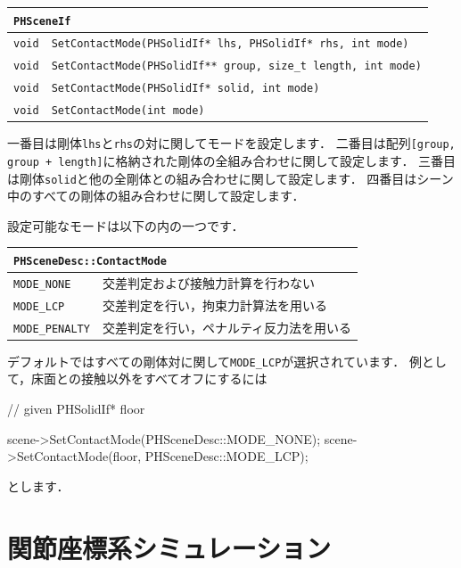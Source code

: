 \begin{center}
\begin{longtable}{p{.1\hsize}p{.9\hsize}}
\multicolumn{2}{l}{\texttt{PHSceneIf}}						\\ \midrule
\texttt{void}	& \texttt{SetContactMode(PHSolidIf* lhs, PHSolidIf* rhs, int mode)} \\
\texttt{void}   & \texttt{SetContactMode(PHSolidIf** group, size\_t length, int mode)} \\
\texttt{void}   & \texttt{SetContactMode(PHSolidIf* solid, int mode)} \\
\texttt{void}   & \texttt{SetContactMode(int mode)}
\end{longtable}
\end{center}

\KLUDGE 一番目は剛体\texttt{lhs}と\texttt{rhs}の対に関してモードを設定します．
\KLUDGE 二番目は配列\texttt{[group, group + length]}に格納された剛体の全組み合わせに関して設定します．
\KLUDGE 三番目は剛体\texttt{solid}と他の全剛体との組み合わせに関して設定します．
\KLUDGE 四番目はシーン中のすべての剛体の組み合わせに関して設定します．

\KLUDGE 設定可能なモードは以下の内の一つです．
\begin{center}
\begin{longtable}{p{.3\hsize}p{.7\hsize}}
\multicolumn{2}{l}{\texttt{PHSceneDesc::ContactMode}} \\ \midrule
\texttt{MODE\_NONE}	   & 交差判定および接触力計算を行わない \\
\texttt{MODE\_LCP}     & 交差判定を行い，拘束力計算法を用いる \\
\texttt{MODE\_PENALTY} & 交差判定を行い，ペナルティ反力法を用いる \\
\end{longtable}
\end{center}
\KLUDGE デフォルトではすべての剛体対に関して\texttt{MODE\_LCP}が選択されています．
\KLUDGE 例として，床面との接触以外をすべてオフにするには
\begin{sourcecode}
// given PHSolidIf* floor

scene->SetContactMode(PHSceneDesc::MODE_NONE);
scene->SetContactMode(floor, PHSceneDesc::MODE_LCP);
\end{sourcecode}
\KLUDGE とします．

\section{関節座標系シミュレーション}

